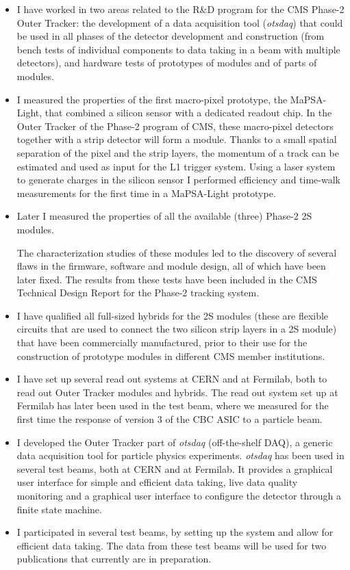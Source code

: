 \documentclass[]{cv} %
\begin{document}
\begin{resume}
\begin{itemize}
  \item I have worked in two areas related to the R\&D program for the CMS
        Phase-2 Outer Tracker: the development of a data acquisition tool
        (\textit{otsdaq}) that could be used in all phases of the detector
        development and construction (from bench tests of individual components
        to data taking in a beam with multiple detectors), and hardware tests of
        prototypes of modules and of parts of modules.
  \item I measured the properties of the first macro-pixel prototype, the
        MaPSA-Light, that combined a silicon sensor with a dedicated readout
        chip. In the Outer Tracker of the Phase-2 program of CMS, these
        macro-pixel detectors together with a strip detector will form a module.
        Thanks to a small spatial separation of the pixel and the strip layers,
        the momentum of a track can be estimated and used as input for the L1
        trigger system. Using a laser system to generate charges in the silicon
        sensor I performed efficiency and time-walk measurements for the first
        time in a MaPSA-Light prototype.
  \item Later I measured the properties of all the available (three) Phase-2 2S
        modules.
        
        The characterization studies of these modules led to the
        discovery of several flaws in the firmware, software and module design,
        all of which have been later fixed. The results from these tests have
        been included in the CMS Technical Design Report for the Phase-2
        tracking system.
  \item I have qualified all full-sized hybrids for the 2S modules (these are
        flexible circuits that are used to connect the two silicon strip layers
        in a 2S module) that have been commercially manufactured, prior to their
        use for the construction of prototype modules in different CMS member
        institutions.
  \item I have set up several read out systems at CERN and at Fermilab, both to
        read out Outer Tracker modules and hybrids. The read out system set up
        at Fermilab has later been used in the test beam, where we measured for
        the first time the response of version 3 of the CBC ASIC to a particle
        beam.
  \item I developed the Outer Tracker part of \textit{otsdaq} (off-the-shelf
        DAQ), a generic data acquisition tool for particle physics experiments.
        \textit{otsdaq} has been used in several test beams, both at CERN and at
        Fermilab. It provides a graphical user interface for simple and
        efficient data taking, live data quality monitoring and a graphical user
        interface to configure the detector through a finite state machine.
  \item I participated in several test beams, by setting up the system and allow
        for efficient data taking. The data from these test beams will be used
        for two publications that currently are in preparation.
\end{itemize}


\end{resume}
\end{document}
